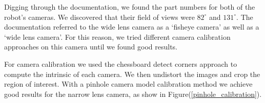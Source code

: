 \documentclass[12pt,letterpaper]{article}
\begin{document}
Digging through the documentation, we found the part numbers for both of the robot's cameras. We discovered that their field of views were $82^\circ$ and $131^\circ$. The documentation referred to the wide lens camera as a `fisheye camera' as well as a `wide lens camera'. For this reason, we tried different camera calibration approaches on this camera until we found good results.

For camera calibration we used the chessboard detect corners approach to compute the intrinsic of each camera. We then undistort the images and crop the region of interest. With a pinhole camera model calibration method we achieve good results for the narrow lens camera, as show in Figure(\ref{pinhole_calibration}).

\end{document}
